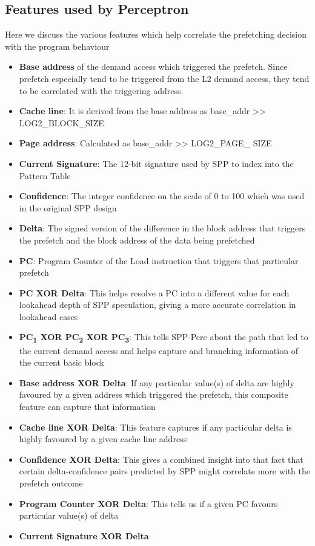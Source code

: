 \documentclass{sig-alternate}
\begin{document}
\subsection{Features used by Perceptron}

Here we discuss the various features which help correlate the prefetching decision with the program behaviour
\begin{itemize}
\item \textbf{Base address} of the demand access which triggered the prefetch. 
Since prefetch especially tend to be triggered from the L2 demand access, they tend to be correlated with the triggering address.
\item \textbf{Cache line}: It is derived from the base address as base\_addr >> LOG2\_BLOCK\_SIZE
\item \textbf{Page address}: Calculated as base\_addr >> LOG2\_PAGE\_ SIZE
\item \textbf{Current Signature}: The 12-bit signature used by SPP to index into the Pattern Table
\item \textbf{Confidence}: The integer confidence on the scale of 0 to 100 which was used in the original SPP design
\item \textbf{Delta}: The signed version of the difference in the block address that triggers the prefetch and the block address of the data being prefetched
\item \textbf{PC}: Program Counter of the Load instruction that triggers that particular prefetch
\item \textbf{PC XOR Delta}: This helps resolve a PC into a different value for each lookahead depth of SPP speculation, giving a more accurate correlation in lookahead cases
\item \textbf{PC\textsubscript{1} XOR PC\textsubscript{2} XOR PC\textsubscript{3}}: This tells SPP-Perc about the path that led to the current demand access and helps capture and branching information of the current basic block
\item \textbf{Base address XOR Delta}: If any particular value(s) of delta are highly favoured by a given address which triggered the prefetch, this composite feature can capture that information
\item \textbf{Cache line XOR Delta}: This feature captures if any particular delta is highly favoured by a given cache line address
\item \textbf{Confidence XOR Delta}: This gives a combined insight into that fact that certain delta-confidence pairs predicted by SPP might correlate more with the prefetch outcome
\item \textbf{Program Counter XOR Delta}: This tells us if a given PC favours particular value(s) of delta
\item \textbf{Current Signature XOR Delta}: 
\end{itemize} 
\end{document}
